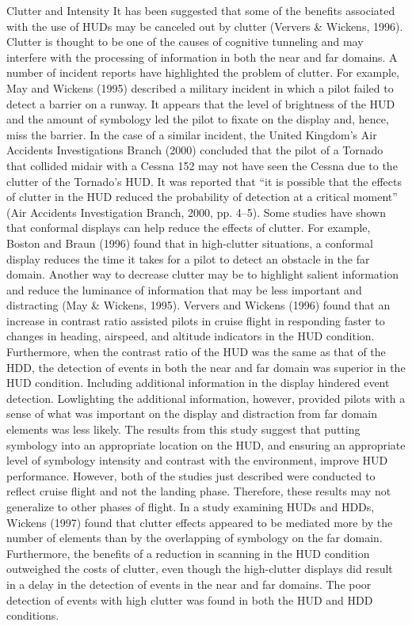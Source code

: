 \documentclass[utf8,bachelor,manualbib]{gradu3}
\begin{document}
Clutter and Intensity
It has been suggested that some of the benefits associated with the use of HUDs
may be canceled out by clutter (Ververs \& Wickens, 1996). Clutter is thought to
be one of the causes of cognitive tunneling and may interfere with the processing
of information in both the near and far domains. A number of incident reports
have highlighted the problem of clutter. For example, May and Wickens
(1995) described a military incident in which a pilot failed to detect a barrier on
a runway. It appears that the level of brightness of the HUD and the amount of
symbology led the pilot to fixate on the display and, hence, miss the barrier. In
the case of a similar incident, the United Kingdom’s Air Accidents Investigations
Branch (2000) concluded that the pilot of a Tornado that collided midair
with a Cessna 152 may not have seen the Cessna due to the clutter of the Tornado’s
HUD. It was reported that “it is possible that the effects of clutter in the
HUD reduced the probability of detection at a critical moment” (Air Accidents
Investigation Branch, 2000, pp. 4–5).
Some studies have shown that conformal displays can help reduce the effects of
clutter. For example, Boston and Braun (1996) found that in high-clutter situations,
a conformal display reduces the time it takes for a pilot to detect an obstacle
in the far domain.
Another way to decrease clutter may be to highlight salient information and reduce
the luminance of information that may be less important and distracting (May
\& Wickens, 1995). Ververs and Wickens (1996) found that an increase in contrast
ratio assisted pilots in cruise flight in responding faster to changes in heading, airspeed,
and altitude indicators in the HUD condition. Furthermore, when the contrast
ratio of the HUD was the same as that of the HDD, the detection of events in
both the near and far domain was superior in the HUD condition. Including additional
information in the display hindered event detection. Lowlighting the additional
information, however, provided pilots with a sense of what was important
on the display and distraction from far domain elements was less likely. The results
from this study suggest that putting symbology into an appropriate location
on the HUD, and ensuring an appropriate level of symbology intensity and contrast
with the environment, improve HUD performance. However, both of the
studies just described were conducted to reflect cruise flight and not the landing
phase. Therefore, these results may not generalize to other phases of flight.
In a study examining HUDs and HDDs, Wickens (1997) found that clutter effects
appeared to be mediated more by the number of elements than by the overlapping
of symbology on the far domain. Furthermore, the benefits of a reduction in
scanning in the HUD condition outweighed the costs of clutter, even though the
high-clutter displays did result in a delay in the detection of events in the near and
far domains. The poor detection of events with high clutter was found in both the
HUD and HDD conditions. \citep{crawford2006}
\end{document}

